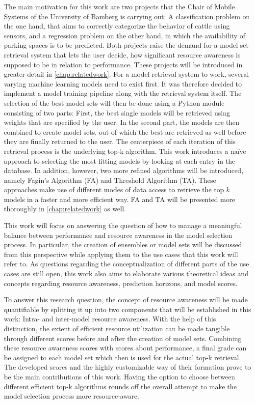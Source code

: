 The main motivation for this work are two projects that the Chair of Mobile Systems of the University of Bamberg is carrying out: A classification problem on the one hand, that aims to correctly categorize the behavior of cattle using sensors, and a regression problem on the other hand, in which the availability of parking spaces is to be predicted. Both projects raise the demand for a model set retrieval system that lets the user decide, how significant resource awareness is supposed to be in relation to performance. These projects will be introduced in greater detail in \autoref{chap:relatedwork}. For a model retrieval system to work, several varying machine learning models need to exist first. It was therefore decided to implement a model training pipeline along with the retrieval system itself. The selection of the best model sets will then be done using a Python module consisting of two parts: First, the best single models will be retrieved using weights that are specified by the user. In the second part, the models are then combined to create model sets, out of which the best are retrieved as well before they are finally returned to the user. The centerpiece of each iteration of this retrieval process is the underlying top-k algorithm. This work introduces a naïve approach to selecting the most fitting models by looking at each entry in the database. In addition, however, two more refined algorithms will be introduced, namely Fagin's Algorithm (FA) and Threshold Algorithm (TA). These approaches make use of different modes of data access to retrieve the top $k$ models in a faster and more efficient way. FA and TA will be presented more thoroughly in \autoref{chap:relatedwork} as well.

This work will focus on answering the question of how to manage a meaningful balance between performance and resource awareness in the model selection process. In particular, the creation of ensembles or model sets will be discussed from this perspective while applying them to the use cases that this work will refer to. As questions regarding the conceptualization of different parts of the use cases are still open, this work also aims to elaborate various theoretical ideas and concepts regarding resource awareness, prediction horizons, and model scores.

To answer this research question, the concept of resource awareness will be made quantifiable by splitting it up into two components that will be established in this work: Intra- and inter-model resource awareness. With the help of this distinction, the extent of efficient resource utilization can be made tangible through different scores before and after the creation of model sets. Combining these resource awareness scores with scores about performance, a final grade can be assigned to each model set which then is used for the actual top-k retrieval. The developed scores and the highly customizable way of their formation prove to be the main contributions of this work. Having the option to choose between different efficient top-k algorithms rounds off the overall attempt to make the model selection process more resource-aware. 

